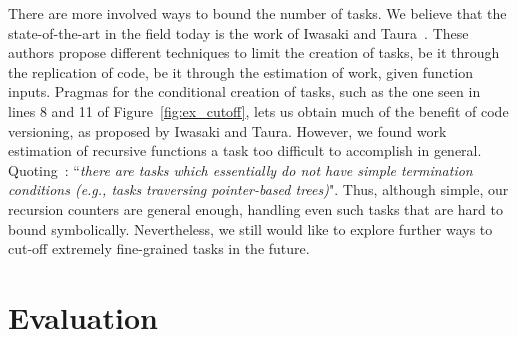 \documentclass[sigplan,10pt,screen]{acmart}
\begin{document}
There are more involved ways to bound the number of tasks.
We believe that the state-of-the-art in the field today is the work of
Iwasaki and Taura~\cite{Iwasaki16,Iwasaki16B}.
These authors propose different techniques to limit the creation of tasks,
be it through the replication of code, be it through the estimation of work,
given function inputs.
Pragmas for the conditional creation of tasks, such as the one seen in
lines 8 and 11 of Figure~\ref{fig:ex_cutoff}, lets us obtain much of the benefit
of code versioning, as proposed by Iwasaki and Taura.
However, we found work estimation of recursive functions a task too difficult
to accomplish in general.
Quoting~\cite[p.355]{Iwasaki16}: ``{\em there are tasks which essentially do not
have simple termination conditions (e.g., tasks traversing pointer-based
trees)}".
Thus, although simple, our recursion counters are general enough, handling even
such tasks that are hard to bound symbolically.
Nevertheless, we still would like to explore further ways to cut-off extremely
fine-grained tasks in the future.

\section{Evaluation}
\label{sec:eval}


\end{document}
